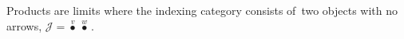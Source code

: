 
Products are limits where the indexing category consists of \,two objects with no arrows, $\mathcal{J}=\boxed{\overset{v}\bullet\ \overset{w}\bullet}$\,.
